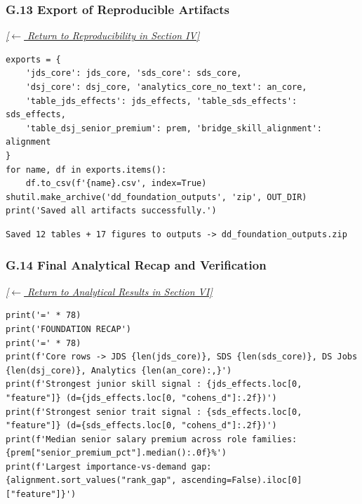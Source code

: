 \documentclass[conference]{IEEEtran}
\begin{document}
\subsubsection*{G.13 Export of Reproducible Artifacts}
\label{lst:export}
\textit{\hyperref[sec:pipeline]{[$\leftarrow$ Return to Reproducibility in Section IV]}}

\begin{lstlisting}[style=pythonstyle,caption={Automated serialization of clean tables, bridge matrices, and figures.},label={lst:export_code}]
exports = {
    'jds_core': jds_core, 'sds_core': sds_core,
    'dsj_core': dsj_core, 'analytics_core_no_text': an_core,
    'table_jds_effects': jds_effects, 'table_sds_effects': sds_effects,
    'table_dsj_senior_premium': prem, 'bridge_skill_alignment': alignment
}
for name, df in exports.items():
    df.to_csv(f'{name}.csv', index=True)
shutil.make_archive('dd_foundation_outputs', 'zip', OUT_DIR)
print('Saved all artifacts successfully.')
\end{lstlisting}

\begin{lstlisting}[style=outputstyle,caption={Execution Output G.13: Export Archive Generation Trace.},label={out:export}]
Saved 12 tables + 17 figures to outputs -> dd_foundation_outputs.zip
\end{lstlisting}

\subsubsection*{G.14 Final Analytical Recap and Verification}
\label{lst:recap}
\textit{\hyperref[sec:results]{[$\leftarrow$ Return to Analytical Results in Section VI]}}

\begin{lstlisting}[style=pythonstyle,caption={One-screen summary log confirming statistical signal integrity.},label={lst:recap_code}]
print('=' * 78)
print('FOUNDATION RECAP')
print('=' * 78)
print(f'Core rows -> JDS {len(jds_core)}, SDS {len(sds_core)}, DS Jobs {len(dsj_core)}, Analytics {len(an_core):,}')
print(f'Strongest junior skill signal : {jds_effects.loc[0, "feature"]} (d={jds_effects.loc[0, "cohens_d"]:.2f})')
print(f'Strongest senior trait signal : {sds_effects.loc[0, "feature"]} (d={sds_effects.loc[0, "cohens_d"]:.2f})')
print(f'Median senior salary premium across role families: {prem["senior_premium_pct"].median():.0f}%')
print(f'Largest importance-vs-demand gap: {alignment.sort_values("rank_gap", ascending=False).iloc[0]["feature"]}')
\end{lstlisting}
\end{document}
